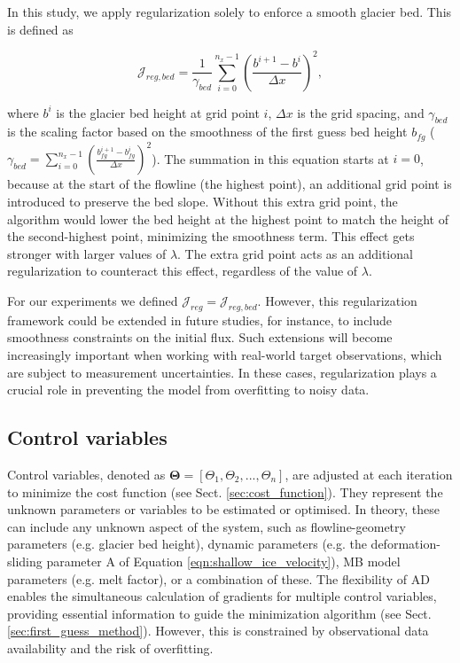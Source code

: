 \documentclass[journal abbreviation, manuscript]{copernicus}
\begin{document}
In this study, we apply regularization solely to enforce a smooth glacier bed. This is defined as

\begin{equation}
    \mathcal{J}_{reg,bed} = \frac{1}{\gamma_{bed}} \sum_{i=0}^{n_x - 1} \left(\frac{b^{i+1} - b^{i}}{\Delta x}\right)^2,
\end{equation}

\noindent where $b^i$ is the glacier bed height at grid point $i$, $\Delta x$ is the grid spacing, and $\gamma_{bed}$ is the scaling factor based on the smoothness of the first guess bed height $b_{fg}$ ($\gamma_{bed}=\sum_{i=0}^{n_x-1} \left(\frac{b_{fg}^{i+1} - b_{fg}^{i}}{\Delta x}\right)^2$). The summation in this equation starts at $i=0$, because at the start of the flowline (the highest point), an additional grid point is introduced to preserve the bed slope. Without this extra grid point, the algorithm would lower the bed height at the highest point to match the height of the second-highest point, minimizing the smoothness term. This effect gets stronger with larger values of $\lambda$. The extra grid point acts as an additional regularization to counteract this effect, regardless of the value of $\lambda$.

For our experiments we defined $\mathcal{J}_{reg} = \mathcal{J}_{reg,bed}$. However, this regularization framework could be extended in future studies, for instance, to include smoothness constraints on the initial flux. Such extensions will become increasingly important when working with real-world target observations, which are subject to measurement uncertainties. In these cases, regularization plays a crucial role in preventing the model from overfitting to noisy data.


\subsection{Control variables}
\label{sec:control_variabls}

Control variables, denoted as $\boldsymbol{\Theta} = [\Theta_1, \Theta_2, ..., \Theta_n]$, are adjusted at each iteration to minimize the cost function (see Sect. \ref{sec:cost_function}). They represent the unknown parameters or variables to be estimated or optimised. In theory, these can include any unknown aspect of the system, such as flowline-geometry parameters (e.g. glacier bed height), dynamic parameters (e.g. the deformation-sliding parameter A of Equation \ref{eqn:shallow_ice_velocity}), MB model parameters (e.g. melt factor), or a combination of these. The flexibility of AD enables the simultaneous calculation of gradients for multiple control variables, providing essential information to guide the minimization algorithm (see Sect. \ref{sec:first_guess_method}). However, this is constrained by observational data availability and the risk of overfitting.
\end{document}
